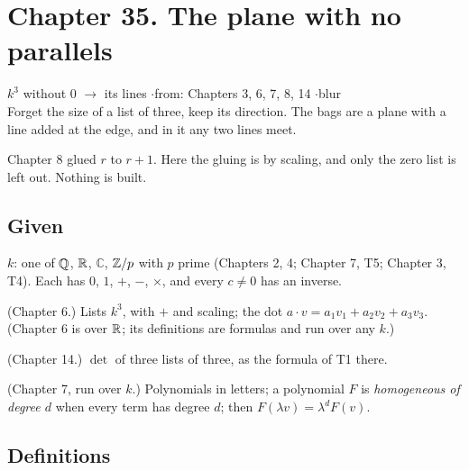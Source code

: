 \section*{Chapter 35. The plane with no parallels}
\begin{center}
{\normalsize $k^3$ without $0$ $\to$ its lines \quad$\cdot$\quad from: Chapters 3, 6, 7, 8, 14 \quad$\cdot$\quad blur}\\[4pt]
{\small Forget the size of a list of three, keep its direction. The bags are a plane with a line added at the edge, and in it any two lines meet.}
\end{center}

Chapter 8 glued $r$ to $r + 1$. Here the gluing is by scaling, and only the zero list is left out. Nothing is built.

\subsection*{Given}

\begin{lines}
\item[\lab{G1}] $k$: one of $\mathbb{Q}$, $\mathbb{R}$, $\mathbb{C}$, $\mathbb{Z}/p$ with $p$ prime (Chapters 2, 4; Chapter 7, T5; Chapter 3, T4). Each has $0$, $1$, $+$, $-$, $\times$, and every $c \ne 0$ has an inverse.
\item[\lab{G2}] (Chapter 6.) Lists $k^3$, with $+$ and scaling; the dot $a \cdot v = a_1 v_1 + a_2 v_2 + a_3 v_3$. (Chapter 6 is over $\mathbb{R}$; its definitions are formulas and run over any $k$.)
\item[\lab{G3}] (Chapter 14.) $\det$ of three lists of three, as the formula of T1 there.
\item[\lab{G4}] (Chapter 7, run over $k$.) Polynomials in letters; a polynomial $F$ is \emph{homogeneous of degree $d$} when every term has degree $d$; then $F(\lambda v) = \lambda^d F(v)$.
\end{lines}

\subsection*{Definitions}

